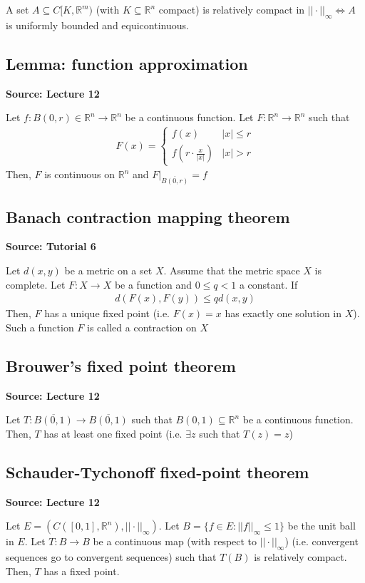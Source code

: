 \documentclass[11pt]{article}
\newcommand{\R}{\mathbb{R}}
\begin{document}
A set $A \subseteq C[K, \R^m)$ (with $K \subseteq \R^n$ compact) is relatively compact in $||\cdot ||_\infty \Longleftrightarrow A$ is uniformly bounded and equicontinuous. 

\subsection{Lemma: function approximation}
\textbf{Source: Lecture 12}

Let $f : B(0,r) \in \R^n \to \R^n$ be a continuous function. Let $F: \R^n \to \R^n$ such that
\begin{align*}
    F(x) = \begin{cases}
    f(x) & |x| \leq r \\
    f(r\cdot \frac{x}{|x|}) & |x| > r
    \end{cases}
\end{align*}
Then, $F$ is continuous on $\R^n$ and $F\Big|_{\overline{B(0,r)}} = f$

\subsection{Banach contraction mapping theorem}
\textbf{Source: Tutorial 6}

Let $d(x,y)$ be a metric on a set $X$. Assume that the metric space $X$ is complete. Let $F : X \to X$ be a function and $0 \leq q < 1$ a constant. If 
\begin{align*}
    d(F(x), F(y)) \leq qd(x,y) \tag{$\forall x, y \in X$}
\end{align*}
Then, $F$ has a unique fixed point (i.e. $F(x) = x$ has exactly one solution in $X$). Such a function $F$ is called a contraction on $X$

\subsection{Brouwer's fixed point theorem}
\textbf{Source: Lecture 12}

Let $T: \overline{B(0,1)}\to \overline{B(0,1)}$ such that $B(0,1) \subseteq \R^n$ be a continuous function. Then, $T$ has at least one fixed point (i.e. $\exists z$ such that $T(z) = z$) 

\subsection{Schauder-Tychonoff fixed-point theorem}
\textbf{Source: Lecture 12}

Let $E = (C([0,1], \R^n), ||\cdot||_\infty)$. Let $B = \{f \in E: ||f||_\infty \leq 1 \}$ be the unit ball in $E$. Let $T: B \to B$ be a continuous map (with respect to $||\cdot||_\infty$) (i.e. convergent sequences go to convergent sequences) such that $T(B)$ is relatively compact. Then, $T$ has a fixed point. 
\end{document}
